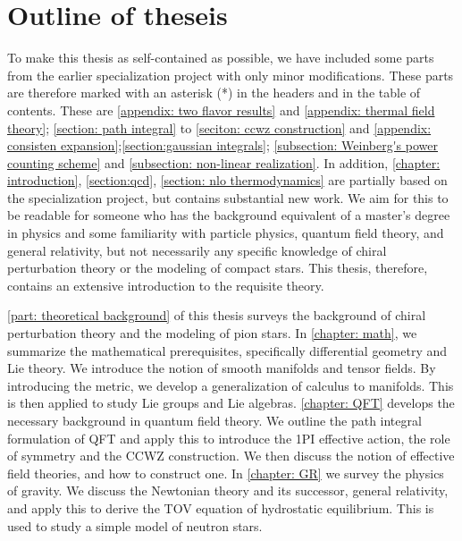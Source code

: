 \section{Outline of theseis}

To make this thesis as self-contained as possible, we have included some parts from the earlier specialization project with only minor modifications.
These parts are therefore marked with an asterisk (*) in the headers and in the table of contents.
These are \autoref{appendix: two flavor results} and \autoref{appendix: thermal field theory}; \autoref{section: path integral} to \autoref{seciton: ccwz construction} and \autoref{appendix: consisten expansion};\autoref{section:gaussian integrals}; \autoref{subsection: Weinberg's power counting scheme} and \autoref{subsection: non-linear realization}.
In addition, \autoref{chapter: introduction}, \autoref{section:qcd}, \autoref{section: nlo thermodynamics} are partially based on the specialization project, but contains substantial new work.
We aim for this to be readable for someone who has the background equivalent of a master's degree in physics and some familiarity with particle physics, quantum field theory, and general relativity, but not necessarily any specific knowledge of chiral perturbation theory or the modeling of compact stars.
This thesis, therefore, contains an extensive introduction to the requisite theory.

\autoref{part: theoretical background} of this thesis surveys the background of chiral perturbation theory and the modeling of pion stars.
In \autoref{chapter: math}, we summarize the mathematical prerequisites, specifically differential geometry and Lie theory.
We introduce the notion of smooth manifolds and tensor fields.
By introducing the metric, we develop a generalization of calculus to manifolds.
This is then applied to study Lie groups and Lie algebras.
\autoref{chapter: QFT} develops the necessary background in quantum field theory.
We outline the path integral formulation of QFT and apply this to introduce the 1PI effective action, the role of symmetry and the CCWZ construction.
We then discuss the notion of effective field theories, and how to construct one.
In \autoref{chapter: GR} we survey the physics of gravity.
We discuss the Newtonian theory and its successor, general relativity, and apply this to derive the TOV equation of hydrostatic equilibrium.
This is used to study a simple model of neutron stars.

